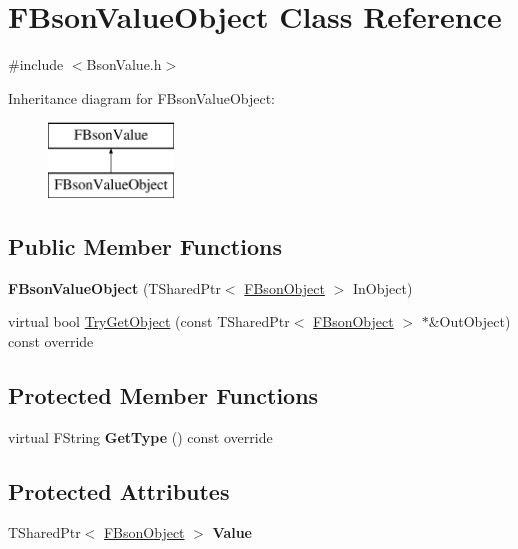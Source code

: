 \hypertarget{class_f_bson_value_object}{}\section{F\+Bson\+Value\+Object Class Reference}
\label{class_f_bson_value_object}


{\ttfamily \#include $<$Bson\+Value.\+h$>$}

Inheritance diagram for F\+Bson\+Value\+Object\+:\begin{figure}[H]
\begin{center}
\leavevmode
\includegraphics[height=2.000000cm]{class_f_bson_value_object}
\end{center}
\end{figure}
\subsection*{Public Member Functions}
\begin{DoxyCompactItemize}
\item 
\mbox{\label{class_f_bson_value_object_a910522eb48a9c7eb710b519b1b4ff222}} 
{\bfseries F\+Bson\+Value\+Object} (T\+Shared\+Ptr$<$ \mbox{\hyperlink{class_f_bson_object}{F\+Bson\+Object}} $>$ In\+Object)
\item 
virtual bool \mbox{\hyperlink{class_f_bson_value_object_adf5ee6fb14cdfea399c4c25a4778a414}{Try\+Get\+Object}} (const T\+Shared\+Ptr$<$ \mbox{\hyperlink{class_f_bson_object}{F\+Bson\+Object}} $>$ $\ast$\&Out\+Object) const override
\end{DoxyCompactItemize}
\subsection*{Protected Member Functions}
\begin{DoxyCompactItemize}
\item 
\mbox{\label{class_f_bson_value_object_a99c28f5b4da46f0d125aa8df806a11a4}} 
virtual F\+String {\bfseries Get\+Type} () const override
\end{DoxyCompactItemize}
\subsection*{Protected Attributes}
\begin{DoxyCompactItemize}
\item 
\mbox{\label{class_f_bson_value_object_af87e9a843fca3a9e882d0cc396f675ba}} 
T\+Shared\+Ptr$<$ \mbox{\hyperlink{class_f_bson_object}{F\+Bson\+Object}} $>$ {\bfseries Value}
\end{DoxyCompactItemize}
